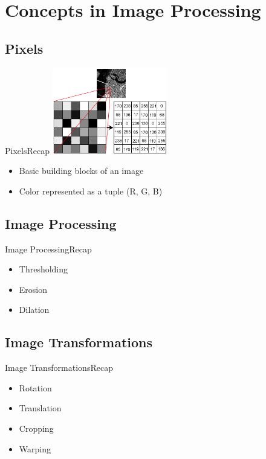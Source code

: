 \documentclass{beamer}
\begin{document}
\section{Concepts in Image Processing}
\subsection{Pixels}

\begin{frame}{Pixels}{Recap}
\centering
    \includegraphics[width=50mm]{images/pixel.png} 

\begin{itemize}
\item Basic building blocks of an image
\item Color represented as a tuple (R, G, B)
\end{itemize}
\end{frame}

\subsection{Image Processing}
\begin{frame}{Image Processing}{Recap}
\begin{itemize}
\item Thresholding
\pause
\item Erosion
\pause
\item Dilation
\end{itemize}
\end{frame}

\subsection{Image Transformations}
\begin{frame}{Image Transformations}{Recap}
\begin{itemize}
\item Rotation
\pause
\item Translation
\pause
\item Cropping
\pause
\item Warping
\end{itemize}
\end{frame}
\end{document}
